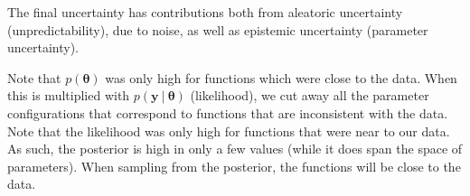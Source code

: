 \documentclass[a4paper, 12pt]{article}
\renewcommand{\vec}[1]{\boldsymbol{#1}}
\begin{document}
            The final uncertainty has contributions both from aleatoric uncertainty (unpredictability), due to noise, as well as epistemic uncertainty (parameter uncertainty).
            \medskip

            Note that $p(\vec{\theta})$ was only high for functions which were close to the data.
            When this is multiplied with $p(\vec{y}\ |\ \vec{\theta})$ (likelihood), we cut away all the parameter configurations that correspond to functions that are inconsistent with the data.
            Note that the likelihood was only high for functions that were near to our data.
            As such, the posterior is high in only a few values (while it does span the space of parameters).
            When sampling from the posterior, the functions will be close to the data.
            \medskip
\end{document}

